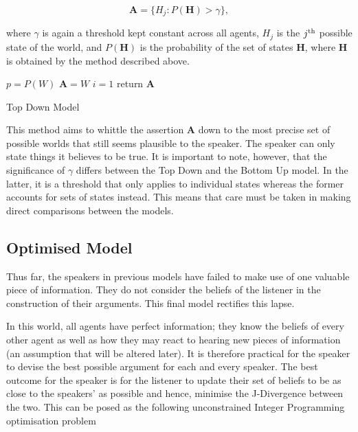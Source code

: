 \begin{equation}
    \mathbf{A} = \{ H_j: P(\mathbf{H}) > \gamma  \},
\end{equation}

where $\gamma$ is again a threshold kept constant across all agents, $H_j$ is the $j^{\textnormal{th}}$ possible state of the world, and $P(\mathbf{H})$ is the probability of the set of states $\mathbf{H}$, where $\mathbf{H}$ is obtained by the method described above.

\begin{algorithm}[H]
\SetAlgoLined
{}
 $p = P(W)$\;
 $\mathbf{A} = W$\;
 $i=1$\;
 return $\mathbf{A}$\;
 \caption{Top Down Model} \label{alg:TD}
\end{algorithm}


This method aims to whittle the assertion $\mathbf{A}$ down to the most precise set of possible worlds that still seems plausible to the speaker. The speaker can only state things it believes to be true. It is important to note, however, that the significance of $\gamma$ differs between the Top Down and the Bottom Up model. In the latter, it is a threshold that only applies to individual states whereas the former accounts for sets of states instead. This means that care must be taken in making direct comparisons between the models. 


\subsection*{Optimised Model}

Thus far, the speakers in previous models have failed to make use of one valuable piece of information. They do not consider the beliefs of the listener in the construction of their arguments. This final model rectifies this lapse. 

In this world, all agents have perfect information; they know the beliefs of every other agent as well as how they may react to hearing new pieces of information (an assumption that will be altered later). It is therefore practical for the speaker to devise the best possible argument for each and every speaker. The best outcome for the speaker is for the listener to update their set of beliefs to be as close to the speakers' as possible and hence, minimise the J-Divergence between the two. This can be posed as the following unconstrained Integer Programming optimisation problem

